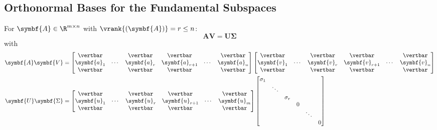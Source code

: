 \documentclass{article}
\begin{document}
\subsection{Orthonormal Bases for the Fundamental Subspaces}
For \(\symbf{A}\in\R^{m \times n}\) with \(\vrank{\left( \symbf{A}
\right)} = r \leq n\):
\begin{equation*}
    \symbf{A} \symbf{V} = \symbf{U} \symbf{\Sigma}
\end{equation*}
with
\begin{align*}
    \symbf{A} \symbf{V}      & =
    \begin{bmatrix}
        \vertbar    &        & \vertbar    & \vertbar        &        & \vertbar    \\
        \symbf{a}_1 & \cdots & \symbf{a}_r & \symbf{a}_{r+1} & \cdots & \symbf{a}_n \\
        \vertbar    &        & \vertbar    & \vertbar        &        & \vertbar
    \end{bmatrix}
    \begin{bmatrix}
        \vertbar    &        & \vertbar    & \vertbar        &        & \vertbar    \\
        \symbf{v}_1 & \cdots & \symbf{v}_r & \symbf{v}_{r+1} & \cdots & \symbf{v}_n \\
        \vertbar    &        & \vertbar    & \vertbar        &        & \vertbar
    \end{bmatrix}
    \\
    \symbf{U} \symbf{\Sigma} & =
    \begin{bmatrix}
        \vertbar    &        & \vertbar    & \vertbar        &        & \vertbar    \\
        \symbf{u}_1 & \cdots & \symbf{u}_r & \symbf{u}_{r+1} & \cdots & \symbf{u}_m \\
        \vertbar    &        & \vertbar    & \vertbar        &        & \vertbar
    \end{bmatrix}
    \begin{bmatrix}
        \sigma_1 &        &          &   &        &   \\
                 & \ddots &          &   &        &   \\
                 &        & \sigma_r &   &        &   \\
                 &        &          & 0 &        &   \\
                 &        &          &   & \ddots &   \\
                 &        &          &   &        & 0 \\

\end{bmatrix}
\end{align*}
\end{document}
